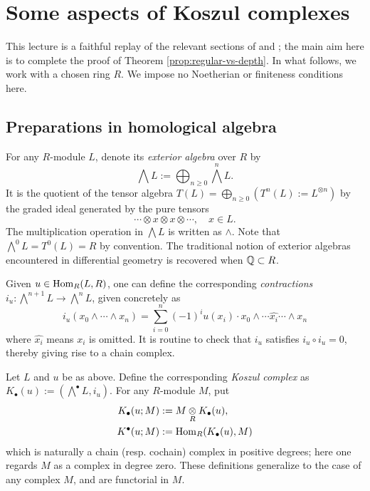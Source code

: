 
\chapter{Some aspects of Koszul complexes}

This lecture is a faithful replay of the relevant sections of \cite{Bour80} and \cite{Bour98}; the main aim here is to complete the proof of Theorem \ref{prop:regular-vs-depth}. In what follows, we work with a chosen ring $R$. We impose no Noetherian or finiteness conditions here.

\section{Preparations in homological algebra}
For any $R$-module $L$, denote its \emph{exterior algebra} over $R$ by
\[ \bigwedge L := \bigoplus_{n \geq 0} \bigwedge^n L. \]
It is the quotient of the tensor algebra $T(L) = \bigoplus_{n \geq 0} (T^n(L) := L^{\otimes n})$ by the graded ideal generated by the pure tensors
\[ \cdots \otimes x \otimes x \otimes \cdots, \quad x \in L. \]
The multiplication operation in $\bigwedge L$ is written as $\wedge$. Note that $\bigwedge^0 L = T^0(L) = R$ by convention. The traditional notion of exterior algebras encountered in differential geometry is recovered when $\mathbb{Q} \subset R$.

Given $u \in \operatorname{Hom}_R(L, R)$, one can define the corresponding \emph{contractions} $i_u: \bigwedge^{n+1} L \to \bigwedge^n L$, given concretely as
\[ i_u (x_0 \wedge \cdots \wedge x_n) = \sum_{i=0}^n (-1)^i u(x_i) \cdot x_0 \wedge \cdots \widehat{x_i} \cdots \wedge x_n \]
where $\widehat{x_i}$ means $x_i$ is omitted. It is routine to check that $i_u$ satisfies $i_u \circ i_u = 0$, thereby giving rise to a chain complex.

\begin{definition}\label{def:Koszul-general}
	Let $L$ and $u$ be as above. Define the corresponding \emph{Koszul complex} as $K_\bullet(u) := (\bigwedge^\bullet L, i_u)$. For any $R$-module $M$, put
	\begin{align*}
		K_\bullet(u; M) & := M \underset{R}{\otimes} K_\bullet(u), \\
		K^\bullet(u; M) & := \operatorname{Hom}_R(K_\bullet(u), M)
	\end{align*}
	which is naturally a chain (resp. cochain) complex in positive degrees; here one regards $M$ as a complex in degree zero. These definitions generalize to the case of any complex $M$, and are functorial in $M$.
\end{definition}

